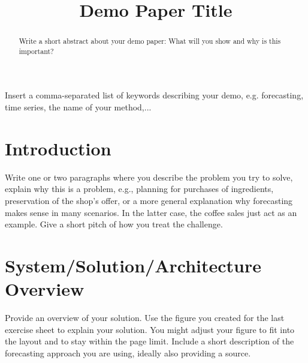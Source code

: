 \documentclass[conference]{IEEEtran}
\begin{document}
\title{Demo Paper Title}

\author{
\and
{}
\and
{}
}

\maketitle

\begin{abstract}
Write a short abstract about your demo paper: What will you show and why is this important?
\end{abstract}

\begin{IEEEkeywords}
Insert a comma-separated list of keywords describing your demo, e.g. forecasting, time series, the name of your method,...
\end{IEEEkeywords}

\section{Introduction}
Write one or two paragraphs where you describe the problem you try to solve, explain why this is a problem, e.g., planning for purchases of ingredients, preservation of the shop's offer, or a more general explanation why forecasting makes sense in many scenarios. In the latter case, the coffee sales just act as an example. Give a short pitch of how you treat the challenge.

\section{System/Solution/Architecture Overview}
Provide an overview of your solution. Use the figure you created for the last exercise sheet to explain your solution. You might adjust your figure to fit into the layout and to stay within the page limit. Include a short description of the forecasting approach you are using, ideally also providing a source.
\end{document}
